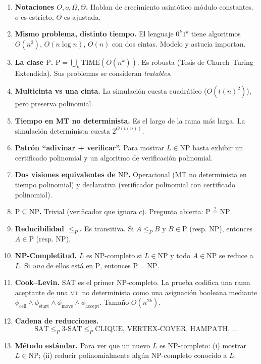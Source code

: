 \documentclass[11pt,a4paper]{article}
\theoremstyle{definicion}
\newcommand{\MT}{\textsc{mt}}
\newcommand{\redP}{\leq_{P}}
\newcommand{\NP}{\mathrm{NP}}
\newcommand{\Pclass}{\mathrm{P}}
\newcommand{\TIME}{\mathrm{TIME}}
\begin{document}
\begin{enumerate}
    \item \textbf{Notaciones $O, o, \Omega, \Theta$.} Hablan de crecimiento asint\'otico m\'odulo constantes. $o$ es estricto, $\Theta$ es ajustada.
    \item \textbf{Mismo problema, distinto tiempo.} El lenguaje $0^k 1^k$ tiene algoritmos $O(n^2)$, $O(n \log n)$, $O(n)$ con dos cintas. Modelo y astucia importan.
    \item \textbf{La clase $\Pclass$.} $\Pclass = \bigcup_k \TIME(O(n^k))$. Es robusta (Tesis de Church--Turing Extendida). Sus problemas se consideran \emph{tratables}.
    \item \textbf{Multicinta vs una cinta.} La simulaci\'on cuesta cuadr\'atico ($O(t(n)^2)$), pero preserva polinomial.
    \item \textbf{Tiempo en MT no determinista.} Es el largo de la rama m\'as larga. La simulaci\'on determinista cuesta $2^{O(t(n))}$.
    \item \textbf{Patr\'on ``adivinar + verificar''.} Para mostrar $L \in \NP$ basta exhibir un certificado polinomial y un algoritmo de verificaci\'on polinomial.
    \item \textbf{Dos visiones equivalentes de $\NP$.} Operacional (MT no determinista en tiempo polinomial) y declarativa (verificador polinomial con certificado polinomial).
    \item \textbf{$\Pclass \subseteq \NP$.} Trivial (verificador que ignora $c$). Pregunta abierta: $\Pclass \overset{?}{=} \NP$.
    \item \textbf{Reducibilidad $\redP$.} Es transitiva. Si $A \redP B$ y $B \in \Pclass$ (resp. $\NP$), entonces $A \in \Pclass$ (resp. $\NP$).
    \item \textbf{NP-Completitud.} $L$ es NP-completo si $L \in \NP$ y todo $A \in \NP$ se reduce a $L$. Si \emph{uno} de ellos est\'a en $\Pclass$, entonces $\Pclass = \NP$.
    \item \textbf{Cook--Levin.} SAT es el primer NP-completo. La prueba codifica una rama aceptante de una \MT\ no determinista como una asignaci\'on booleana mediante $\phi_{\text{cell}} \land \phi_{\text{start}} \land \phi_{\text{move}} \land \phi_{\text{accept}}$. Tama\~no $O(n^{2k})$.
    \item \textbf{Cadena de reducciones.}
    \[
    \mathrm{SAT} \redP \mathrm{3\text{-}SAT} \redP \mathrm{CLIQUE},\, \mathrm{VERTEX\text{-}COVER},\, \mathrm{HAMPATH},\, \dots
    \]
    \item \textbf{M\'etodo est\'andar.} Para ver que un nuevo $L$ es NP-completo: (i) mostrar $L \in \NP$; (ii) reducir polinomialmente alg\'un NP-completo conocido a $L$.

\end{enumerate}
\end{document}
